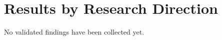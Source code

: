 \section{Results by Research Direction}
\label{sec:results}

No validated findings have been collected yet.
